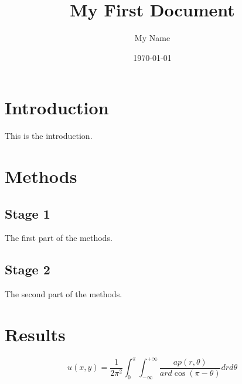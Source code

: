 \documentclass{article}
\begin{document}
\title{My First Document}
\author{My Name}
\date{\today}
\maketitle
\section{Introduction}
This is the introduction.
\section{Methods}
\subsection{Stage 1}
The first part of the methods.
\subsection{Stage 2}
The second part of the methods.
\section{Results}
$$
    u(x,y)=
    \frac{1}{2\pi^2}
    \int^\pi_0
    \int^{+\infty}_{-\infty}
    \frac{ap(r,\theta)}{ard\cos(\pi-\theta)}
    drd\theta
$$
\end{document}
